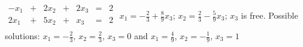 {$\begin{array}{KQJQKQQ}
-x_1&+&2x_2&+&2x_3&=&2\\
2x_1&+&5x_2&+&x_3&=&2\\
\end{array}$}
{$x_1=-\frac23+\frac89x_3$; $x_2=\frac23-\frac59x_3$; $x_3$ is free. Possible solutions: $x_1 = -\frac23$, $x_2 = \frac23$, $x_3 = 0$ and $x_1 = \frac49$, $x_2 = -\frac19$, $x_3 = 1$}
